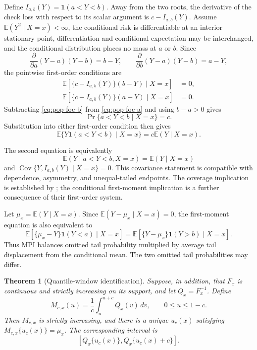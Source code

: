 \documentclass[11pt]{article}
\newcommand{\E}{\mathbb{E}}
\newcommand{\ind}{\mathbf{1}}
\newtheorem{theorem}{Theorem}
\begin{document}
Define \(I_{a,b}(Y)=\ind(a<Y<b)\). Away from the two roots, the derivative of
the check loss with respect to its scalar argument is
\(c-I_{a,b}(Y)\). Assume
\(\E(Y^2\mid X=x)<\infty\), the conditional risk is differentiable at an
interior stationary point, differentiation and conditional expectation may be
interchanged, and the conditional distribution places no mass at \(a\) or
\(b\). Since
\[
\frac{\partial}{\partial a}(Y-a)(Y-b)=b-Y,
\qquad
\frac{\partial}{\partial b}(Y-a)(Y-b)=a-Y,
\]
the pointwise first-order conditions are
\begin{align}
\E\left[\{c-I_{a,b}(Y)\}(b-Y)\mid X=x\right]&=0,
\label{eq:pop-foc-a}\\
\E\left[\{c-I_{a,b}(Y)\}(a-Y)\mid X=x\right]&=0.
\label{eq:pop-foc-b}
\end{align}
Subtracting \eqref{eq:pop-foc-b} from \eqref{eq:pop-foc-a} and using
\(b-a>0\) gives
\[
\Pr\{a<Y<b\mid X=x\}=c.
\]
Substitution into either first-order condition then gives
\[
\E\{Y\ind(a<Y<b)\mid X=x\}=c\E(Y\mid X=x).
\]

The second equation is equivalently
\[
\E(Y\mid a<Y<b,X=x)=\E(Y\mid X=x)
\]
and
\(\operatorname{Cov}\{Y,I_{a,b}(Y)\mid X=x\}=0\). This covariance statement is
compatible with dependence, asymmetry, and unequal-tailed endpoints. The
coverage implication is established by \citet{PouplinEtAl2024RQR}; the
conditional first-moment implication is a further consequence of their
first-order system.

Let \(\mu_x=\E(Y\mid X=x)\). Since
\(\E(Y-\mu_x\mid X=x)=0\), the first-moment equation is also equivalent to
\begin{equation}
\E[\{\mu_x-Y\}\ind(Y<a)\mid X=x]
=
\E[\{Y-\mu_x\}\ind(Y>b)\mid X=x].
\label{eq:rqr-tail-moment-balance}
\end{equation}
Thus MPI balances omitted tail probability multiplied by average
tail displacement from the conditional mean. The two omitted tail probabilities
may differ.

\begin{theorem}[Quantile-window identification]
\label{thm:supp-quantile-window}
Suppose, in addition, that \(F_x\) is continuous and strictly increasing on
its support, and let \(Q_x=F_x^{-1}\). Define
\[
M_{c,x}(u)=\frac{1}{c}\int_u^{u+c}Q_x(v)\,dv,
\qquad 0\le u\le1-c.
\]
Then \(M_{c,x}\) is strictly increasing, and there is a unique \(u_c(x)\)
satisfying \(M_{c,x}\{u_c(x)\}=\mu_x\). The corresponding interval is
\[
\left[Q_x\{u_c(x)\},Q_x\{u_c(x)+c\}\right].
\]
\end{theorem}
\end{document}
